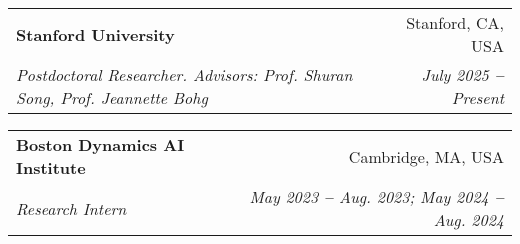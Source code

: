 \documentclass[letterpaper,11pt]{article}
\makeatletter
\newcommand{\resumeItem}[1]{
  \item\small{
    {#1 \vspace{-2pt}}
  }
}
\newcommand{\resumeSubheading}[4]{
  \vspace{-4pt}\item
    \begin{tabular*}{0.97\textwidth}[t]{l@{\extracolsep{\fill}}r}
      \textbf{\small#1} & \small#2 \\
      \textit{\small#3} & \textit{\small #4} \\
    \end{tabular*}\vspace{-7pt}
}
\newcommand{\resumeEducationHeading}[6]{
  \vspace{-2pt}\item
    \begin{tabular*}{0.97\textwidth}[t]{l@{\extracolsep{\fill}}r}
      \textbf{\small#1} & \small #2 \\
      \textit{\small#3} & \textit{\small #4} \\
      \textit{\small#5} & \textit{\small #6} \\
    \end{tabular*}\vspace{-5pt}
}
\newcommand{\resumeProjectHeading}[2]{
    \vspace{-7pt}\item
    \begin{tabular*}{0.97\textwidth}{l@{\extracolsep{\fill}}r}
      \hspace{13pt}\small#1 & #2 \\
    \end{tabular*}\vspace{-7pt}
}
\newcommand{\resumeItemListStart}{\begin{itemize}}
\newcommand{\resumeItemListEnd}{\end{itemize}\vspace{-5pt}}
\makeatother
\begin{document}






\resumeSubheading
{Stanford University}{Stanford, CA, USA}
{Postdoctoral Researcher. Advisors: Prof. Shuran Song, Prof. Jeannette Bohg}{July 2025 \textbf{--} Present}
\resumeSubheading
{Boston Dynamics AI Institute}{Cambridge, MA, USA}
{Research Intern}{May 2023 \textbf{--} Aug. 2023; May 2024 \textbf{--} Aug. 2024}
\end{document}
